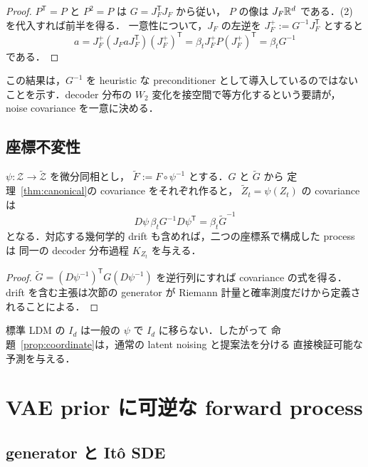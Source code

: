 \documentclass[uplatex,dvipdfmx,11pt,a4paper]{jsarticle}
\begin{document}
\begin{proof}
  $P^{\mathsf T}=P$ と $P^2=P$ は $G=J_F^{\mathsf T}J_F$ から従い，
  $P$ の像は $J_F\mathbb{R}^d$ である．(2) を代入すれば前半を得る．
  一意性について，$J_F$ の左逆を $J_F^+:=G^{-1}J_F^{\mathsf T}$ とすると
  \[
    a=J_F^+(J_FaJ_F^{\mathsf T})(J_F^+)^{\mathsf T}
      =\beta_tJ_F^+P(J_F^+)^{\mathsf T}
      =\beta_tG^{-1}
  \]
  である．
\end{proof}

この結果は，$G^{-1}$ を heuristic な preconditioner として導入しているのではない
ことを示す．decoder 分布の $W_2$ 変化を接空間で等方化するという要請が，
noise covariance を一意に決める．

\subsection{座標不変性}

\begin{proposition}[潜在座標の取り替えに対する不変性]
\label{prop:coordinate}
  $\psi\colon\mathcal{Z}\to\widetilde{\mathcal{Z}}$ を微分同相とし，
  $\widetilde F:=F\circ\psi^{-1}$ とする．$G$ と $\widetilde G$ から
  定理~\ref{thm:canonical}の covariance をそれぞれ作ると，
  $\widetilde Z_t=\psi(Z_t)$ の covariance は
  \[
    D\psi\,\beta_tG^{-1}D\psi^{\mathsf T}
    =\beta_t\widetilde G^{-1}
  \]
  となる．対応する幾何学的 drift も含めれば，二つの座標系で構成した process は
  同一の decoder 分布過程 $K_{Z_t}$ を与える．
\end{proposition}

\begin{proof}
  $\widetilde G=(D\psi^{-1})^{\mathsf T}G(D\psi^{-1})$ を逆行列にすれば
  covariance の式を得る．drift を含む主張は次節の generator が
  Riemann 計量と確率測度だけから定義されることによる．
\end{proof}

標準 LDM の $I_d$ は一般の $\psi$ で $I_d$ に移らない．したがって
命題~\ref{prop:coordinate}は，通常の latent noising と提案法を分ける
直接検証可能な予測を与える．

\section{VAE prior に可逆な forward process}
\label{sec:forward}

\subsection{generator と It\^o SDE}
\end{document}
